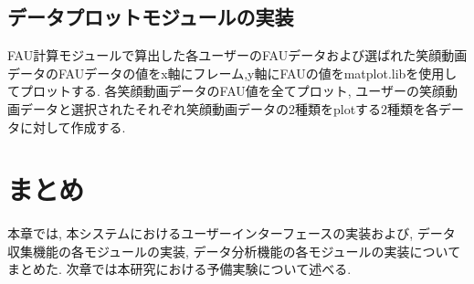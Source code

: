 \subsection{データプロットモジュールの実装}
FAU計算モジュールで算出した各ユーザーのFAUデータおよび選ばれた笑顔動画データのFAUデータの値をx軸にフレーム,y軸にFAUの値をmatplot.libを使用してプロットする.
各笑顔動画データのFAU値を全てプロット, ユーザーの笑顔動画データと選択されたそれぞれ笑顔動画データの2種類をplotする2種類を各データに対して作成する.

\section{まとめ}
本章では, 本システムにおけるユーザーインターフェースの実装および, データ収集機能の各モジュールの実装,
データ分析機能の各モジュールの実装についてまとめた.
次章では本研究における予備実験について述べる.
